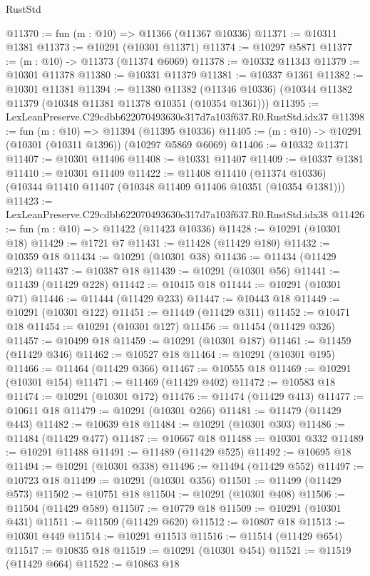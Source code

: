 \begin{lexlean}{RustStd}
\begin{coremodule}
@11370 := fun (m : @10) => @11366 (@11367 @10336)
@11371 := @10311 @1381
@11373 := @10291 (@10301 @11371)
@11374 := @10297 @5871
@11377 := (m : @10) -> @11373 (@11374 @6069)
@11378 := @10332 @11343
@11379 := @10301 @11378
@11380 := @10331 @11379
@11381 := @10337 @1361
@11382 := @10301 @11381
@11394 := @11380
    @11382
    (@11346 @10336)
    (@10344 @11382 @11379 (@10348 @11381 @11378 @10351 (@10354 @1361)))
@11395 := LexLeanPreserve.C29cdbb622070493630e317d7a103f637.R0.RustStd.idx37
@11398 := fun (m : @10) => @11394 (@11395 @10336)
@11405 := (m : @10) -> @10291 (@10301 (@10311 @1396)) (@10297 @5869 @6069)
@11406 := @10332 @11371
@11407 := @10301 @11406
@11408 := @10331 @11407
@11409 := @10337 @1381
@11410 := @10301 @11409
@11422 := @11408
    @11410
    (@11374 @10336)
    (@10344 @11410 @11407 (@10348 @11409 @11406 @10351 (@10354 @1381)))
@11423 := LexLeanPreserve.C29cdbb622070493630e317d7a103f637.R0.RustStd.idx38
@11426 := fun (m : @10) => @11422 (@11423 @10336)
@11428 := @10291 (@10301 @18)
@11429 := @1721 @7
@11431 := @11428 (@11429 @180)
@11432 := @10359 @18
@11434 := @10291 (@10301 @38)
@11436 := @11434 (@11429 @213)
@11437 := @10387 @18
@11439 := @10291 (@10301 @56)
@11441 := @11439 (@11429 @228)
@11442 := @10415 @18
@11444 := @10291 (@10301 @71)
@11446 := @11444 (@11429 @233)
@11447 := @10443 @18
@11449 := @10291 (@10301 @122)
@11451 := @11449 (@11429 @311)
@11452 := @10471 @18
@11454 := @10291 (@10301 @127)
@11456 := @11454 (@11429 @326)
@11457 := @10499 @18
@11459 := @10291 (@10301 @187)
@11461 := @11459 (@11429 @346)
@11462 := @10527 @18
@11464 := @10291 (@10301 @195)
@11466 := @11464 (@11429 @366)
@11467 := @10555 @18
@11469 := @10291 (@10301 @154)
@11471 := @11469 (@11429 @402)
@11472 := @10583 @18
@11474 := @10291 (@10301 @172)
@11476 := @11474 (@11429 @413)
@11477 := @10611 @18
@11479 := @10291 (@10301 @266)
@11481 := @11479 (@11429 @443)
@11482 := @10639 @18
@11484 := @10291 (@10301 @303)
@11486 := @11484 (@11429 @477)
@11487 := @10667 @18
@11488 := @10301 @332
@11489 := @10291 @11488
@11491 := @11489 (@11429 @525)
@11492 := @10695 @18
@11494 := @10291 (@10301 @338)
@11496 := @11494 (@11429 @552)
@11497 := @10723 @18
@11499 := @10291 (@10301 @356)
@11501 := @11499 (@11429 @573)
@11502 := @10751 @18
@11504 := @10291 (@10301 @408)
@11506 := @11504 (@11429 @589)
@11507 := @10779 @18
@11509 := @10291 (@10301 @431)
@11511 := @11509 (@11429 @620)
@11512 := @10807 @18
@11513 := @10301 @449
@11514 := @10291 @11513
@11516 := @11514 (@11429 @654)
@11517 := @10835 @18
@11519 := @10291 (@10301 @454)
@11521 := @11519 (@11429 @664)
@11522 := @10863 @18

\end{coremodule}
\end{lexlean}
